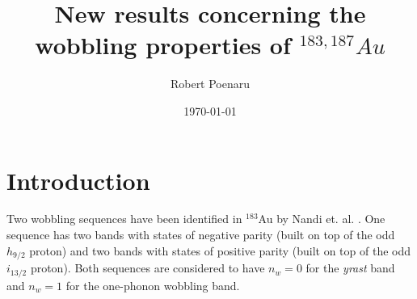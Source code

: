 \documentclass[12pt, a4paper]{article}
\title{New results concerning the wobbling properties of $^{183,187}Au$}
\author{Robert Poenaru}
\date{\today}
\begin{document}
\maketitle

\section{Introduction}

Two wobbling sequences have been identified in $^{183}$Au by Nandi et. al. \cite{nandi2020}. One sequence has two bands with states of negative parity (built on top of the odd $h_{9/2}$ proton) and two bands with states of positive parity (built on top of the odd $i_{13/2}$ proton). Both sequences are considered to have $n_w=0$ for the \textit{yrast} band and $n_w=1$ for the one-phonon wobbling band.
\end{document}
